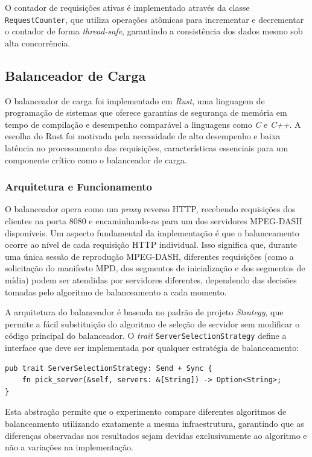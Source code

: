 O contador de requisições ativas é implementado através da classe \texttt{RequestCounter}, que utiliza operações atômicas para incrementar e decrementar o contador de forma \textit{thread-safe}, garantindo a consistência dos dados mesmo sob alta concorrência.

\subsection{Balanceador de Carga}

O balanceador de carga foi implementado em \textit{Rust}, uma linguagem de programação de sistemas que oferece garantias de segurança de memória em tempo de compilação e desempenho comparável a linguagens como \textit{C} e \textit{C++}. A escolha do Rust foi motivada pela necessidade de alto desempenho e baixa latência no processamento das requisições, características essenciais para um componente crítico como o balanceador de carga.

\subsubsection{Arquitetura e Funcionamento}

O balanceador opera como um \textit{proxy} reverso HTTP, recebendo requisições dos clientes na porta 8080 e encaminhando-as para um dos servidores MPEG-DASH disponíveis. Um aspecto fundamental da implementação é que o balanceamento ocorre ao nível de cada requisição HTTP individual. Isso significa que, durante uma única sessão de reprodução MPEG-DASH, diferentes requisições (como a solicitação do manifesto MPD, dos segmentos de inicialização e dos segmentos de mídia) podem ser atendidas por servidores diferentes, dependendo das decisões tomadas pelo algoritmo de balanceamento a cada momento.

A arquitetura do balanceador é baseada no padrão de projeto \textit{Strategy}, que permite a fácil substituição do algoritmo de seleção de servidor sem modificar o código principal do balanceador. O \textit{trait} \texttt{ServerSelectionStrategy} define a interface que deve ser implementada por qualquer estratégia de balanceamento:

\begin{verbatim}
pub trait ServerSelectionStrategy: Send + Sync {
    fn pick_server(&self, servers: &[String]) -> Option<String>;
}
\end{verbatim}

Esta abstração permite que o experimento compare diferentes algoritmos de balanceamento utilizando exatamente a mesma infraestrutura, garantindo que as diferenças observadas nos resultados sejam devidas exclusivamente ao algoritmo e não a variações na implementação.

